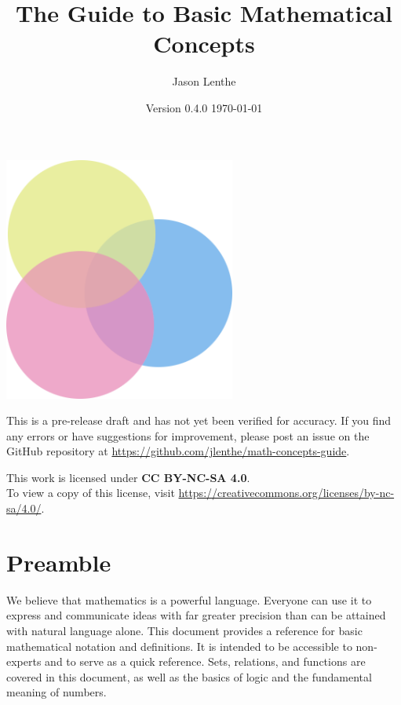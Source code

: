 \documentclass[letterpaper]{article}
\title{\sffamily\textbf{The Guide to Basic Mathematical Concepts}}
\author{\sffamily Jason Lenthe}
\date{Version 0.4.0 \quad \today}
\begin{document}
\maketitle
\vskip 0.5in
\begin{center}
    \includegraphics[width=3in]{images/logo.png}
\end{center}

\vfill
\begin{warning}
  This is a pre-release draft and has not yet been verified for accuracy.
  If you find any errors or have suggestions for improvement, please post
  an issue on the GitHub repository at
  \url{https://github.com/jlenthe/math-concepts-guide}.
\end{warning}
\begin{center}
    {\small This work is licensed under \textbf{CC BY-NC-SA 4.0}.\\
    To view a copy of this license, visit \url{https://creativecommons.org/licenses/by-nc-sa/4.0/}.}
\end{center}

\newpage
\tableofcontents
\newpage

\section*{Preamble}
We believe that mathematics is a powerful language. Everyone can use it to
express and communicate ideas with far greater precision than can be attained
with natural language alone. This document provides a reference for basic
mathematical notation and definitions. It is intended to be accessible to
non-experts and to serve as a quick reference. Sets, relations, and functions
are covered in this document, as well as the basics of logic and the
fundamental meaning of numbers.
\end{document}
